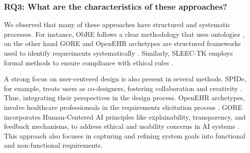 \begin{table}[ht]
  \centering
  \caption{RQ2: Challenges and Limitations of the Approaches}
  \label{tab:selected_papers_RQ2}
  \end{table}


\subsubsection{RQ3: What are the characteristics of these approaches?}
We observed that many of these approaches have structured and systematic processes. For instance, ObRE follows a clear methodology that uses ontologies \cite{guizzardi2023ontology}, on the other hand GORE and OpenEHR archetypes are structured frameworks used
to identify requreiments systematically \cite{10.1145/3701625.3701686, silva2024use}. Similarly, SLEEC-TK employs formal methods to ensure compliance with ethical rules \cite{GETIRYAMAN2024103118}.

A strong focus on user-centered design is also present in several methods. SPIDe, for example, treats users as co-designers, fostering collaboration and creativity \cite{10.1145/3424953.3426498}. Thus, integrating their perspectives in the design process. OpenEHR
archetypes, involve healthcare professionsals in the requirements elicitation process \cite{silva2024use}. GORE incorporates Human-Centered AI principles like explainability, transparency, and feedback mechanisms, to address ethical and usability concerns in AI systems \cite{10.1145/3701625.3701686}.
This approach also focuses in capturing and refining system goals into functional and non-functional requirements.

